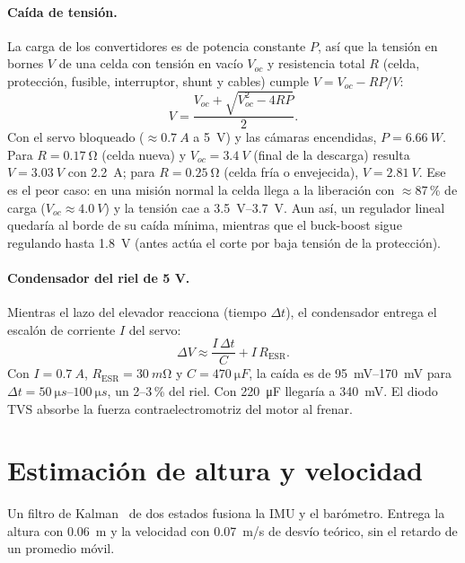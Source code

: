 \paragraph{Caída de tensión.} La carga de los convertidores es de potencia constante $P$,
así que la tensión en bornes $V$ de una celda con tensión en vacío $V_{oc}$ y resistencia
total $R$ (celda, protección, fusible, interruptor, shunt y cables) cumple $V = V_{oc} -
RP/V$:
\begin{equation}
  V = \frac{V_{oc} + \sqrt{V_{oc}^2 - 4RP}}{2}.
  \label{eq:electronica-caida}
\end{equation}
Con el servo bloqueado ($\approx\SI{0.7}{A}$ a \SI{5}{V}) y las cámaras encendidas,
$P=\SI{6.66}{W}$. Para $R=\SI{0.17}{\ohm}$ (celda nueva) y $V_{oc}=\SI{3.4}{V}$ (final de la
descarga) resulta $V=\SI{3.03}{V}$ con \SI{2.2}{A}; para $R=\SI{0.25}{\ohm}$ (celda fría o
envejecida), $V=\SI{2.81}{V}$. Ese es el peor caso: en una misión normal la celda llega a
la liberación con $\approx$87\,\% de carga ($V_{oc}\approx\SI{4.0}{V}$) y la tensión cae a
\SIrange{3.5}{3.7}{V}. Aun así, un regulador lineal quedaría al borde de su caída mínima,
mientras que el buck-boost sigue regulando hasta \SI{1.8}{V} (antes actúa el corte por baja
tensión de la protección).

\paragraph{Condensador del riel de 5 V.} Mientras el lazo del elevador reacciona
(tiempo $\Delta t$), el condensador entrega el escalón de corriente $I$ del servo:
\begin{equation}
  \Delta V \approx \frac{I\,\Delta t}{C} + I\,R_{\mathrm{ESR}}.
  \label{eq:electronica-cap}
\end{equation}
Con $I=\SI{0.7}{A}$, $R_{\mathrm{ESR}}=\SI{30}{m\ohm}$ y $C=\SI{470}{\micro F}$, la caída
es de \SIrange{95}{170}{mV} para $\Delta t=\SIrange{50}{100}{\micro s}$, un 2--3\,\% del
riel. Con \SI{220}{\micro F} llegaría a \SI{340}{mV}. El diodo TVS absorbe la fuerza
contraelectromotriz del motor al frenar.

\section{Estimación de altura y velocidad}\label{sec:electronica-kf}

Un filtro de Kalman~\cite{electronica-kalman1960} de dos estados fusiona la IMU y el
barómetro. Entrega la altura con \SI{0.06}{m} y la velocidad con \SI{0.07}{m/s} de desvío
teórico, sin el retardo de un promedio móvil.

